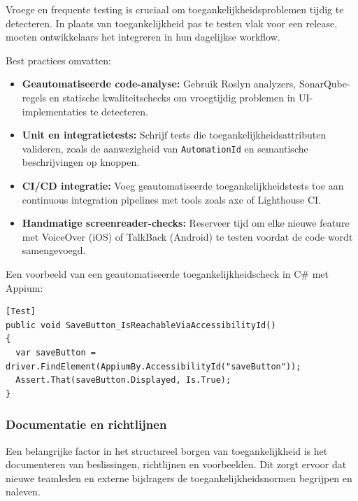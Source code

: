 Vroege en frequente testing is cruciaal om toegankelijkheidsproblemen tijdig te detecteren. In plaats van toegankelijkheid pas te testen vlak voor een release, moeten ontwikkelaars het integreren in hun dagelijkse workflow.

Best practices omvatten:

\begin{itemize}
  \item \textbf{Geautomatiseerde code-analyse:} Gebruik Roslyn analyzers, SonarQube-regels en statische kwaliteitschecks om vroegtijdig problemen in UI-implementaties te detecteren.
  \item \textbf{Unit en integratietests:} Schrijf tests die toegankelijkheidsattributen valideren, zoals de aanwezigheid van \texttt{AutomationId} en semantische beschrijvingen op knoppen.
    \item \textbf{CI/CD integratie:} Voeg geautomatiseerde toegankelijkheidstests toe aan continuous integration pipelines met tools zoals axe of Lighthouse CI.
  \item \textbf{Handmatige screenreader-checks:} Reserveer tijd om elke nieuwe feature met VoiceOver (iOS) of TalkBack (Android) te testen voordat de code wordt samengevoegd.
\end{itemize}

Een voorbeeld van een geautomatiseerde toegankelijkheidscheck in C\# met Appium:

\begin{listing}[H]
\begin{verbatim}
[Test]
public void SaveButton_IsReachableViaAccessibilityId()
{
  var saveButton = driver.FindElement(AppiumBy.AccessibilityId("saveButton"));
  Assert.That(saveButton.Displayed, Is.True);
}
\end{verbatim}
\caption{UI-test die controleert of de knop bereikbaar is via een toegankelijkheidsidentifier.}
\label{lst:a11y-test}
\end{listing}

\subsubsection{Documentatie en richtlijnen}
\label{subsubsec:documentatie}

Een belangrijke factor in het structureel borgen van toegankelijkheid is het documenteren van beslissingen, richtlijnen en voorbeelden. Dit zorgt ervoor dat nieuwe teamleden en externe bijdragers de toegankelijkheidsnormen begrijpen en naleven.

